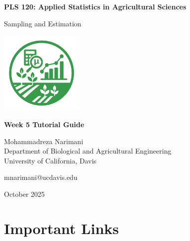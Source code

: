 \documentclass[11pt,a4paper]{article}
\begin{document}
\begin{titlepage}
    \centering
    \vspace*{2cm}
    
    {\Huge\bfseries\color{primarygreen} PLS 120: Applied Statistics in Agricultural Sciences}
    
    \vspace{1cm}
    
    {\Large\color{primarygreen} Sampling and Estimation}
    
    \vspace{2cm}
    
    \includegraphics[width=0.3\textwidth]{../../images/logos/Home_Page_Logo.png}
    
    \vspace{2cm}
    
    {\large\bfseries Week 5 Tutorial Guide}
    
    \vspace{1cm}
    
    {\large Mohammadreza Narimani}\\
    {\normalsize Department of Biological and Agricultural Engineering}\\
    {\normalsize University of California, Davis}
    
    \vspace{1cm}
    
    {\normalsize mnarimani@ucdavis.edu}
    
    \vfill
    
    {\normalsize October 2025}
\end{titlepage}

{\small \tableofcontents}

\section{Important Links}
\end{document}
